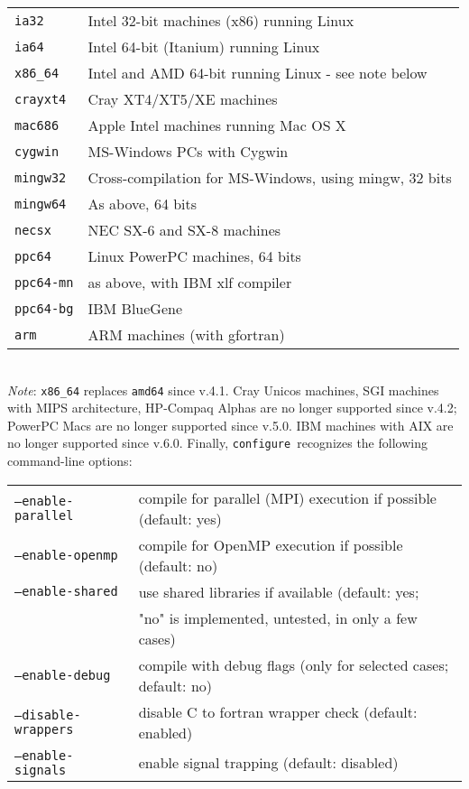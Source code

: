 \documentclass[12pt,a4paper]{article}
\def\configure{\texttt{configure}}
\begin{document}
\begin{tabular}{ll}
\texttt{ia32}&    Intel 32-bit machines (x86) running Linux\\
\texttt{ia64}&    Intel 64-bit (Itanium) running Linux\\
\texttt{x86\_64}&  Intel and AMD 64-bit running Linux - see note below\\
\texttt{crayxt4}& Cray XT4/XT5/XE machines\\
\texttt{mac686}&  Apple Intel machines running Mac OS X\\
\texttt{cygwin}&  MS-Windows PCs with Cygwin\\
\texttt{mingw32}& Cross-compilation for MS-Windows, using mingw, 32 bits\\
\texttt{mingw64}& As above, 64 bits\\
\texttt{necsx}&   NEC SX-6 and SX-8 machines\\
\texttt{ppc64}&   Linux PowerPC machines, 64 bits\\
\texttt{ppc64-mn}&as above, with IBM xlf compiler\\
\texttt{ppc64-bg}&IBM BlueGene\\
\texttt{arm}     &ARM machines (with gfortran)
\end{tabular}\\
{\em Note}: \texttt{x86\_64} replaces \texttt{amd64} since v.4.1.
Cray Unicos machines, SGI
machines with MIPS architecture, HP-Compaq Alphas are no longer supported
since v.4.2; PowerPC Macs are no longer
supported since v.5.0. IBM machines with AIX are no longer supported
since v.6.0.
Finally, \configure\ recognizes the following command-line options:\\
\begin{tabular}{ll}
\texttt{--enable-parallel}&     compile for parallel (MPI) execution if possible (default: yes)\\
\texttt{--enable-openmp}&       compile for OpenMP execution if possible (default: no)\\
\texttt{--enable-shared}&       use shared libraries if available (default: yes;\\
                        &       "no" is implemented, untested, in only a few cases)\\
\texttt{--enable-debug}&        compile with debug flags (only for selected cases; default: no)\\
\texttt{--disable-wrappers}&    disable C to fortran wrapper check (default: enabled)\\
\texttt{--enable-signals}&      enable signal trapping (default: disabled)\\
\end{tabular}\\
\end{document}
